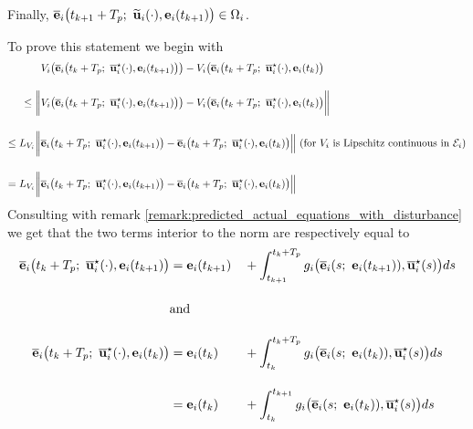 Finally, $\overline{\bm{\mathbf{e}}}_i\big(t_{k+1} + T_p;\ \widetilde{\bm{\mathbf{u}}}_i(\cdot), \bm{\mathbf{e}}_i(t_{k+1}) \big) \in \Omega_i$.
\begin{gg_box}
To prove this statement we begin with
\begin{align}
  & V_i\big(\overline{\vect{e}}_i\big(t_k + T_p;\ \overline{\vect{u}}_i^{\star}(\cdot), \vect{e}_i(t_{k+1})\big)\big)
    - V_i\big(\overline{\vect{e}}_i\big(t_k + T_p;\ \overline{\vect{u}}_i^{\star}(\cdot), \vect{e}_i(t_k)\big) \\[2.5ex]
  \leq \bigg\| & V_i\big(\overline{\vect{e}}_i\big(t_k + T_p;\ \overline{\vect{u}}_i^{\star}(\cdot), \vect{e}_i(t_{k+1})\big)\big)
    - V_i\big(\overline{\vect{e}}_i\big(t_k + T_p;\ \overline{\vect{u}}_i^{\star}(\cdot), \vect{e}_i(t_k)\big) \bigg \| \\[2.5ex]
  \leq L_{V_i}\bigg \|& \overline{\vect{e}}_i\big(t_k + T_p;\ \overline{\vect{u}}_i^{\star}(\cdot), \vect{e}_i(t_{k+1})\big)
    - \overline{\vect{e}}_i\big(t_k + T_p;\ \overline{\vect{u}}_i^{\star}(\cdot), \vect{e}_i(t_k) \big)\Big\|
    \text{ (for } V_i \text{ is Lipschitz continuous in } \mathcal{E}_i \text{)} \\[2.5ex]
  =  L_{V_i}\bigg \| & \overline{\vect{e}}_i\big(t_k + T_p;\ \overline{\vect{u}}_i^{\star}(\cdot), \vect{e}_i(t_{k+1})\big)
    - \overline{\vect{e}}_i\big(t_k + T_p;\ \overline{\vect{u}}_i^{\star}(\cdot), \vect{e}_i(t_k) \big)\Big\|
\label{eq:from_DV_to_De}
\end{align}
Consulting with remark \eqref{remark:predicted_actual_equations_with_disturbance}
we get that the two terms interior to the norm are respectively equal to
\begin{alignat}{2}
  \overline{\vect{e}}_i\big(t_k + T_p;\ \overline{\vect{u}}_i^{\star}(\cdot), \vect{e}_i(t_{k+1})\big)
    &= \vect{e}_i(t_{k+1}) &&+ \int_{t_{k+1}}^{t_k + T_p} g_i\big(\overline{\vect{e}}_i(s;\ \vect{e}_i(t_{k+1})), \overline{\vect{u}}_i^{\star}(s) \big)ds \\[2.5ex]
    &\text{and}\\[2.5ex]
  \overline{\vect{e}}_i\big(t_k + T_p;\ \overline{\vect{u}}_i^{\star}(\cdot), \vect{e}_i(t_k)\big)
    &= \vect{e}_i(t_k)     &&+ \int_{t_k}^{t_k + T_p} g_i\big(\overline{\vect{e}}_i(s;\ \vect{e}_i(t_k)), \overline{\vect{u}}_i^{\star}(s) \big)ds \\[2.5ex]
    &= \vect{e}_i(t_k)     &&+ \int_{t_k}^{t_{k+1}} g_i\big(\overline{\vect{e}}_i(s;\ \vect{e}_i(t_k)), \overline{\vect{u}}_i^{\star}(s) \big)ds \\[2.5ex]

\end{alignat}
\end{gg_box}
